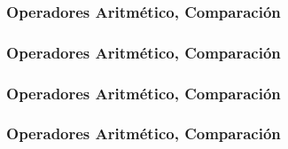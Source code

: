 \documentclass{beamer}
\begin{document}
\begin{frame}
\frametitle{Operadores Aritmético, Comparación}

\end{frame}

\begin{frame}
\frametitle{Operadores Aritmético, Comparación}

\end{frame}

\begin{frame}
\frametitle{Operadores Aritmético, Comparación}

\end{frame}

\begin{frame}
\frametitle{Operadores Aritmético, Comparación}

\end{frame}
\end{document}
